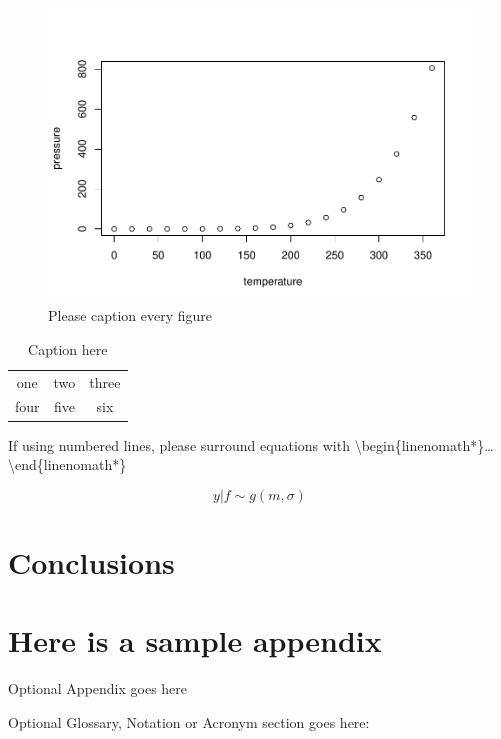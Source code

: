 \documentclass[draft,linenumbers]{agujournal2018}
\begin{document}
\begin{figure}
\includegraphics{StreamFluxArticle_files/figure-latex/unnamed-chunk-3-1} \caption{Please caption every figure}\label{fig:unnamed-chunk-3}
\end{figure}

\begin{table}
\caption{Caption here}
\label{tab:signif_gap_clos}
\begin{tabular}{ccc}
one&two&three\\
four&five&six
\end{tabular}
\end{table}

If using numbered lines, please surround equations with
\textbackslash{}begin\{linenomath*\}\ldots{}
\textbackslash{}end\{linenomath*\}

\begin{linenomath*}
\begin{equation}
y|{f} \sim g(m, \sigma)
\end{equation}
\end{linenomath*}

\section{Conclusions}

\appendix
\section{Here is a sample appendix}

Optional Appendix goes here

Optional Glossary, Notation or Acronym section goes here:
\end{document}
